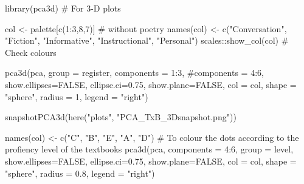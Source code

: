 \documentclass[
  letterpaper,
  DIV=11,
  numbers=noendperiod]{scrreprt}
\newenvironment{Shaded}{\begin{snugshade}}{\end{snugshade}}
\newcommand{\AttributeTok}[1]{\textcolor[rgb]{0.40,0.45,0.13}{#1}}
\newcommand{\CommentTok}[1]{\textcolor[rgb]{0.37,0.37,0.37}{#1}}
\newcommand{\ConstantTok}[1]{\textcolor[rgb]{0.56,0.35,0.01}{#1}}
\newcommand{\DecValTok}[1]{\textcolor[rgb]{0.68,0.00,0.00}{#1}}
\newcommand{\FloatTok}[1]{\textcolor[rgb]{0.68,0.00,0.00}{#1}}
\newcommand{\FunctionTok}[1]{\textcolor[rgb]{0.28,0.35,0.67}{#1}}
\newcommand{\NormalTok}[1]{\textcolor[rgb]{0.00,0.23,0.31}{#1}}
\newcommand{\OtherTok}[1]{\textcolor[rgb]{0.00,0.23,0.31}{#1}}
\newcommand{\SpecialCharTok}[1]{\textcolor[rgb]{0.37,0.37,0.37}{#1}}
\newcommand{\StringTok}[1]{\textcolor[rgb]{0.13,0.47,0.30}{#1}}
\begin{document}
\begin{Shaded}
\begin{Highlighting}[]
\FunctionTok{library}\NormalTok{(pca3d) }\CommentTok{\# For 3{-}D plots}

\NormalTok{col }\OtherTok{\textless{}{-}}\NormalTok{ palette[}\FunctionTok{c}\NormalTok{(}\DecValTok{1}\SpecialCharTok{:}\DecValTok{3}\NormalTok{,}\DecValTok{8}\NormalTok{,}\DecValTok{7}\NormalTok{)] }\CommentTok{\# without poetry}
\FunctionTok{names}\NormalTok{(col) }\OtherTok{\textless{}{-}} \FunctionTok{c}\NormalTok{(}\StringTok{"Conversation"}\NormalTok{, }\StringTok{"Fiction"}\NormalTok{, }\StringTok{"Informative"}\NormalTok{, }\StringTok{"Instructional"}\NormalTok{, }\StringTok{"Personal"}\NormalTok{)}
\NormalTok{scales}\SpecialCharTok{::}\FunctionTok{show\_col}\NormalTok{(col) }\CommentTok{\# Check colours}

\FunctionTok{pca3d}\NormalTok{(pca, }
      \AttributeTok{group =}\NormalTok{ register,}
      \AttributeTok{components =} \DecValTok{1}\SpecialCharTok{:}\DecValTok{3}\NormalTok{,}
      \CommentTok{\#components = 4:6,}
      \AttributeTok{show.ellipses=}\ConstantTok{FALSE}\NormalTok{, }
      \AttributeTok{ellipse.ci=}\FloatTok{0.75}\NormalTok{,}
      \AttributeTok{show.plane=}\ConstantTok{FALSE}\NormalTok{,}
      \AttributeTok{col =}\NormalTok{ col,}
      \AttributeTok{shape =} \StringTok{"sphere"}\NormalTok{,}
      \AttributeTok{radius =} \DecValTok{1}\NormalTok{,}
      \AttributeTok{legend =} \StringTok{"right"}\NormalTok{)}

\FunctionTok{snapshotPCA3d}\NormalTok{(}\FunctionTok{here}\NormalTok{(}\StringTok{"plots"}\NormalTok{, }\StringTok{"PCA\_TxB\_3Dsnapshot.png"}\NormalTok{))}

\FunctionTok{names}\NormalTok{(col) }\OtherTok{\textless{}{-}} \FunctionTok{c}\NormalTok{(}\StringTok{"C"}\NormalTok{, }\StringTok{"B"}\NormalTok{, }\StringTok{"E"}\NormalTok{, }\StringTok{"A"}\NormalTok{, }\StringTok{"D"}\NormalTok{) }\CommentTok{\# To colour the dots according to the profiency level of the textbooks}
\FunctionTok{pca3d}\NormalTok{(pca, }
      \AttributeTok{components =} \DecValTok{4}\SpecialCharTok{:}\DecValTok{6}\NormalTok{,}
      \AttributeTok{group =}\NormalTok{ level,}
      \AttributeTok{show.ellipses=}\ConstantTok{FALSE}\NormalTok{, }
      \AttributeTok{ellipse.ci=}\FloatTok{0.75}\NormalTok{,}
      \AttributeTok{show.plane=}\ConstantTok{FALSE}\NormalTok{,}
      \AttributeTok{col =}\NormalTok{ col,}
      \AttributeTok{shape =} \StringTok{"sphere"}\NormalTok{,}
      \AttributeTok{radius =} \FloatTok{0.8}\NormalTok{,}
      \AttributeTok{legend =} \StringTok{"right"}\NormalTok{)}
\end{Highlighting}
\end{Shaded}
\end{document}
